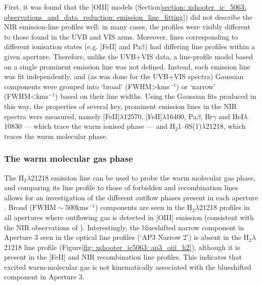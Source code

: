 First, it was found that the [OIII] models (Section\;\ref{section: xshooter_ic_5063: observations_and_data_reduction: emission_line_fitting}) did not describe the NIR emission-line profiles well: in many cases, the profiles were visibly different to those found in the UVB and VIS arms. Moreover, lines corresponding to different ionisation states (e.g. [FeII] and Pa$\mathrm{\beta}$) had differing line profiles within a given aperture. Therefore, unlike the UVB+VIS data, a line-profile model based on a single prominent emission line was not defined. Instead, each emission line was fit independently, and (as was done for the UVB+VIS spectra) Gaussian components were grouped into `broad' (\mbox{FWHM\;\textgreater{}\;km\;s$^{-1}$}) or `narrow' (\mbox{FWHM\;\textless{}\;km\;s$^{-1}$}) based on their line widths. Using the Gaussian fits produced in this way, the properties of several key, prominent emission lines in the NIR spectra were measured, namely [FeII]$\lambda$12570, [FeII]$\lambda$16400, Pa$\beta$, Br$\gamma$ and HeI$\lambda$10830 --- which trace the warm ionised phase --- and H$_2$1--0S(1)$\lambda$21218, which traces the warm molecular phase.

\subsubsection{The warm molecular gas phase}
\label{section: xshooter_ic5063: properties_of_outflowing_gas: nir_analysis_and_results: warm_molecular}

The H$_2 \lambda$21218 emission line can be used to probe the warm molecular gas phase, and comparing its line profile to those of forbidden and recombination lines allows for an investigation of the different outflow phases present in each aperture \citep{Tadhunter2014}. Broad ($\mathrm{FWHM}\sim500$\;km\;s$^{-1}$) components are seen in the H$_2 \lambda$21218 profiles in all apertures where outflowing gas is detected in [OIII] emission (consistent with the NIR observations of \citealt{Tadhunter2014}). Interestingly, the blueshifted narrow component in Aperture 3 seen in the optical line profiles (`AP3 Narrow 2') is absent in the H$_2 \lambda$21218 line profile (Figure\;\ref{fig: xshooter_ic5063: ap3_oiii_h2}), although it is present in the [FeII] and NIR recombination line profiles. This indicates that excited warm-molecular gas is not kinematically associated with the blueshifted component in Aperture 3.

